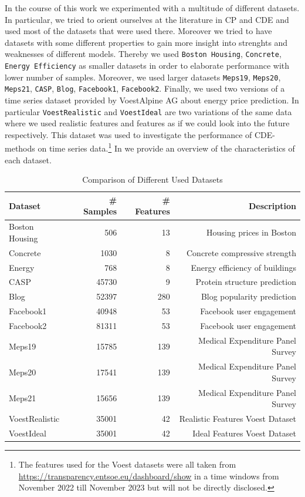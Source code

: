 In the course of this work we experimented with a multitude of different datasets. In particular, we tried to orient ourselves at the literature in CP and CDE \cite{rothfuss2019noise,sesia2021conformal} and used most of the datasets that were used there. Moreover we tried to have datasets with some different properties to gain more insight into strenghts and weaknesses of different models. Thereby we used \texttt{Boston Housing}, \texttt{Concrete}, \texttt{Energy Efficiency} as smaller datasets in order to elaborate performance with lower number of samples. Moreover, we used larger datasets \texttt{Meps19}, \texttt{Meps20}, \texttt{Meps21}, \texttt{CASP}, \texttt{Blog}, \texttt{Facebook1}, \texttt{Facebook2}. Finally, we used two versions of a time series dataset provided by VoestAlpine AG about energy price prediction. In particular \texttt{VoestRealistic} and \texttt{VoestIdeal} are two variations of the same data where we used realistic features and features as if we could look into the future respectively. This dataset was used to investigate the performance of CDE-methods on time series data.\footnote{The features used for the Voest datasets were all taken from \url{https://transparency.entsoe.eu/dashboard/show} in a time windows from November 2022 till November 2023 but will not be directly disclosed.} In  we provide an overview of the characteristics of each dataset.

\begin{table}
        \caption{Comparison of Different Used Datasets}
        \label{tab:dataset_overview}
        \centering
        \begin{tabular}{lrrr}
            \toprule
            Dataset & \# Samples & \# Features & Description\\
            \midrule
            Boston Housing & 506 & 13 & Housing prices in Boston \\
            Concrete & 1030 & 8 & Concrete compressive strength \\
            Energy & 768 & 8 & Energy efficiency of buildings \\
            CASP & 45730 & 9 & Protein structure prediction \\
            Blog & 52397 & 280 & Blog popularity prediction \\
            Facebook1 & 40948 & 53 & Facebook user engagement \\
            Facebook2 & 81311 & 53 & Facebook user engagement \\
            Meps19 & 15785 & 139 & Medical Expenditure Panel Survey \\
            Meps20 & 17541 & 139 & Medical Expenditure Panel Survey \\
            Meps21 & 15656 & 139 & Medical Expenditure Panel Survey \\
            VoestRealistic & 35001 & 42 & Realistic Features Voest Dataset  \\
            VoestIdeal & 35001 & 42 & Ideal Features Voest Dataset \\
            \bottomrule
        \end{tabular}
\end{table}


